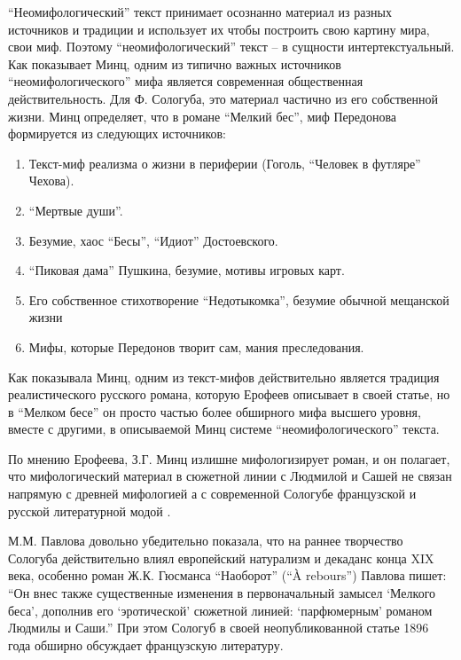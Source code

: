 \documentclass[12pt,a4paper]{article}
\begin{document}
\enquote{Неомифологический} текст принимает осознанно материал из разных источников и традиции и использует их чтобы построить свою картину мира, свои миф. Поэтому \enquote{неомифологический} текст -- в сущности интертекстуальный. Как показывает Минц, одним из типично важных источников \enquote{неомифологического} мифа является современная общественная действительность. Для Ф. Сологуба, это материал частично из его собственной жизни. Минц определяет, что в романе \enquote{Мелкий бес}, миф Передонова формируется из следующих источников:

\begin{enumerate}[itemsep=0mm, label=\asbuk*)]
\item Текст-миф реализма о жизни в периферии (Гоголь, \enquote{Человек в футляре} Чехова).
\item \enquote{Мертвые души}.
\item Безумие, хаос \enquote{Бесы}, \enquote{Идиот} Достоевского.
\item \enquote{Пиковая дама} Пушкина, безумие, мотивы игровых карт.
\item Его собственное стихотворение \enquote{Недотыкомка}, безумие обычной мещанской жизни
\item Мифы, которые Передонов творит сам, мания преследования.
\end{enumerate}


 
Как показывала Минц, одним из текст-мифов действительно является традиция реалистического русского романа, которую Ерофеев описывает в своей статье, но в \enquote{Мелком бесе} он просто частью более обширного мифа высшего уровня, вместе с другими, в описываемой Минц системе \enquote{неомифологического} текста.

По мнению Ерофеева, З.Г. Минц излишне мифологизирует роман, и он полагает, что мифологический материал в сюжетной линии с Людмилой и Сашей не связан напрямую с древней мифологией а с современной Сологубе французской и русской литературной модой \parencite[152]{jerofeev1985}.

М.М. Павлова довольно убедительно показала, что на раннее творчество Сологуба действительно влиял европейский натурализм и декаданс конца XIX века, особенно роман Ж.К. Гюсманса \enquote{Наоборот} (\enquote{À rebours}) Павлова пишет: \enquote{Он внес также существенные изменения в первоначальный замысел \enquote{Мелкого беса}, дополнив его \enquote{эротической} сюжетной линией: \enquote{парфюмерным} романом Людмилы и Саши.} \parencite*[168.]{pavlova2007} При этом Сологуб в своей неопубликованной статье 1896 года  обширно обсуждает французскую литературу.
\end{document}
